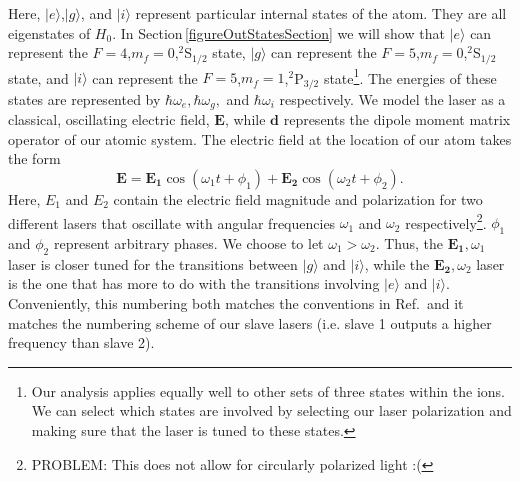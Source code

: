 Here, $|e\rangle$,$|g\rangle$, and $|i\rangle$ represent particular internal states of the atom. They are all eigenstates of $H_0$. In Section\,\ref{figureOutStatesSection} we will show that $|e\rangle$ can represent the $F=4$,$m_f=0$,$^2$S$_{1/2}$ state, $|g\rangle$ can represent the $F=5$,$m_f=0$,$^2$S$_{1/2}$ state, and $|i\rangle$ can represent the $F=5$,$m_f=1$,$^2$P$_{3/2}$ state\footnote{Our analysis applies equally well to other sets of three states within the ions. We can select which states are involved by selecting our laser polarization and making sure that the laser is tuned to these states.}. The energies of these states are represented by $\hbar\omega_e,\hbar\omega_g,$ and $\hbar\omega_i$ respectively. We model the laser as a classical, oscillating electric field, $\mathbf{E}$, while $\mathbf{d}$ represents the dipole moment matrix operator of our atomic system. The electric field at the location of our atom takes the form 
\begin{equation}
\mathbf{E}=\mathbf{E_1} \cos(\omega_1 t + \phi_1) + \mathbf{E_2} \cos(\omega_2t + \phi_2). \label{eqn:Efield}
\end{equation}
Here, $E_1$ and $E_2$ contain the electric field magnitude and polarization for two different lasers that oscillate with angular frequencies $\omega_1$ and $\omega_2$ respectively\footnote{PROBLEM: This does not allow for circularly polarized light :(}. $\phi_1$ and $\phi_2$ represent arbitrary phases. We choose to let $\omega_1>\omega_2$. Thus, the $\mathbf{E_1}, \omega_1$ laser is closer tuned for the transitions between $|g\rangle$ and $|i\rangle$, while the $\mathbf{E_2}, \omega_2$ laser is the one that has more to do with the transitions involving $|e\rangle$ and $|i\rangle$. Conveniently, this numbering both matches the conventions in Ref.\,\cite{Young1997363} and it matches the numbering scheme of our slave lasers (i.e. slave 1 outputs a higher frequency than slave 2). 


